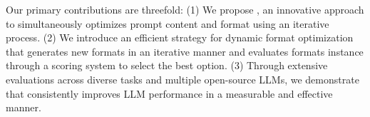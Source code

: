 Our primary contributions are threefold: (1) We propose \textbf{\sysname{}}, an innovative approach to simultaneously optimizes prompt content and format using an iterative process. (2) We introduce an efficient strategy for dynamic format optimization that generates new formats in an iterative manner and evaluates formats instance through a scoring system to select the best option. (3) Through extensive evaluations across diverse tasks and multiple open-source LLMs, we demonstrate that \sysname{} consistently improves LLM performance in a measurable and effective manner.